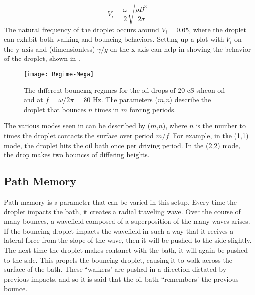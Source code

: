 \begin{equation} \label{vibrationnumber}
V_i = \frac{\omega}{2}\sqrt{\frac{\rho D^3}{2\sigma}}
\end{equation}   	       	       
	       	       The natural frequency of the droplet occurs around $V_i = 0.65$, where the droplet can exhibit both walking and bouncing behaviors. Setting up a plot with $V_i$ on the y axis and (dimensionless) ${\gamma}/{g}$ on the x axis can help in showing the behavior of the droplet, shown in . 
	    
	    \begin{figure}[h]
	   
	       \centering
	    \texttt{[image: Regime-Mega]}
	     \caption{The different bouncing regimes for the oil drops of 20 cS silicon oil and at $f$ = $\omega / 2\pi$ = 80 Hz. The parameters ($m$,$n$) describe the droplet that bounces $n$ times in $m$ forcing periods. }
	 \label{regime}
	\end{figure}

The various modes seen in  can be described by ($m$,$n$), where $n$ is the number to times the droplet contacts the surface over period $m/f$. For example, in the (1,1) mode, the droplet hits the oil bath once per driving period. In the (2,2) mode, the drop makes two bounces of differing heights. 
	       
            \subsection{Path Memory}
            Path memory is a parameter that can be varied in this setup. Every time the droplet impacts the bath, it creates a radial traveling wave. Over the course of many bounces, a wavefield composed of a superposition of the many waves arises. If the bouncing droplet impacts the wavefield in such a way that it recives a lateral force from the slope of the wave, then it will be pushed to the side slightly. The next time the droplet makes contanct with the bath, it will again be pushed to the side. This propels the bouncing droplet, causing it to walk across the surface of the bath. These ``walkers" are pushed in a direction dictated by previous impacts, and so it is said that the oil bath ``remembers" the previous bounce.	  
            
